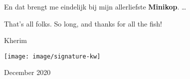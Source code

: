 En dat brengt me eindelijk bij mijn allerliefste \textbf{Minikop}. \ldots
\vspace{5em}

That's all folks. So long, and thanks for all the fish!

Kherim

\texttt{[image: image/signature-kw]}

December 2020



\cleardoublepage

